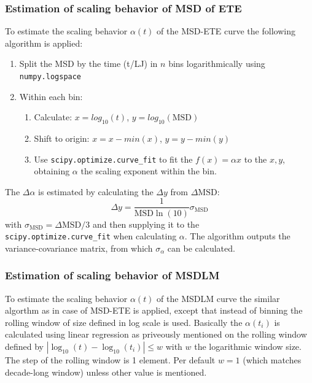 \documentclass[
    paper=A4,pagesize=automedia,fontsize=12pt,
    BCOR=15mm,DIV=22,
    twoside,headinclude,footinclude=false,
    fleqn,             %
    bibliography=totocnumbered,          %
    listof=totoc,                %
    listof=flat,                 %
    cleardoublepage=empty      %
    numbers=endperiod
]{scrartcl}
\begin{document}
\subsubsection{Estimation of scaling behavior of MSD of ETE} \label{sec:est-alpha-msd}
To estimate the scaling behavior $\alpha(t)$ of the MSD-ETE curve the following
algorithm is applied:
\begin{enumerate}
    \item Split the MSD by the time (t/LJ) in $n$ bins logarithmically using
    \texttt{numpy.logspace} \cite{harris2020array}
    \item Within each bin:
    \begin{enumerate}
        \item Calculate: $x=log_{10}(t)$, $y=log_{10}(\text{MSD})$
        \item Shift to origin: $x=x-min(x)$, $y=y-min(y)$
        \item Use \texttt{scipy.optimize.curve_fit} 
        \cite{2020SciPy-NMeth} to fit the $f(x) = \alpha x$ to the $x,y$,
        obtaining $\alpha$ the scaling exponent within the bin.
    \end{enumerate}
\end{enumerate}  
The $\Delta \alpha$ is estimated by calculating the 
$\Delta y$ from $\Delta \text{MSD}$:
\begin{equation}
    \Delta y = \frac{1}{\text{MSD} \ln(10)} \sigma_{\text{MSD}}
\end{equation}
with $\sigma_{\text{MSD}}=\Delta \text{MSD} / 3$
and then supplying it to the  
\\
\texttt{scipy.optimize.curve_fit} \cite{2020SciPy-NMeth}
when calculating $\alpha$. The algorithm outputs the variance-covariance
matrix, from which $\sigma_{\alpha}$ can be calculated.

\subsubsection{Estimation of scaling behavior of MSDLM} \label{sec:est-alpha-msdlm}
To estimate the scaling behavior $\alpha(t)$ of the MSDLM curve the similar
algorthm as in case of MSD-ETE is applied, except that instead of
binning the rolling window of size defined in log scale is used.
Basically the $\alpha(t_i)$ is calculated using linear regression as priveously
mentioned on the rolling window defined by $|\log_{10}(t)-\log_{10}(t_i)| \le w$
with $w$ the logarithmic window size. The step of the rolling window is 1 element.
Per default $w = 1$ (which matches decade-long window) 
unless other value is mentioned.
\end{document}
